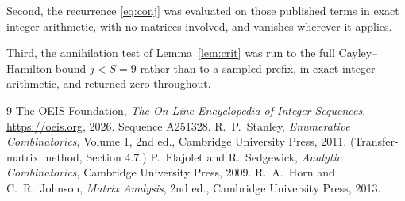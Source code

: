 \documentclass[11pt,a4paper]{article}
\theoremstyle{plain}
\theoremstyle{definition}
\begin{document}
Second, the recurrence \eqref{eq:conj} was evaluated on those published terms in exact
integer arithmetic, with no matrices involved, and vanishes wherever it applies.

Third, the annihilation test of Lemma~\ref{lem:crit} was run to the full Cayley--Hamilton
bound $j<S=9$ rather than to a sampled prefix, in exact integer arithmetic, and returned
zero throughout.

\begin{thebibliography}{9}
 The OEIS Foundation, \emph{The On-Line Encyclopedia of Integer
Sequences}, \url{https://oeis.org}, 2026. Sequence A251328.
 R.~P.~Stanley, \emph{Enumerative Combinatorics}, Volume 1, 2nd ed.,
Cambridge University Press, 2011. (Transfer-matrix method, Section 4.7.)
 P.~Flajolet and R.~Sedgewick, \emph{Analytic Combinatorics}, Cambridge
University Press, 2009.
 R.~A.~Horn and C.~R.~Johnson, \emph{Matrix Analysis}, 2nd ed., Cambridge
University Press, 2013.
\end{thebibliography}
\end{document}
